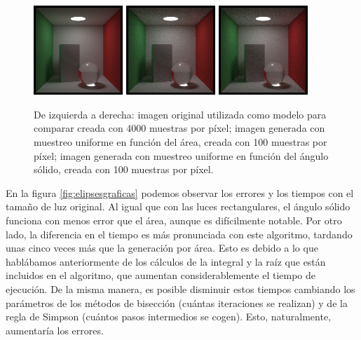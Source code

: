 \documentclass{scrbook}
\begin{document}
\begin{figure}[ht]
	\centering
	\includegraphics[width=0.3\textwidth]{original_ellipse}
	\includegraphics[width=0.3\textwidth]{ellipse_20}
	\includegraphics[width=0.3\textwidth]{ellipse_sa_20}
	
	\caption{De izquierda a derecha: imagen original utilizada como modelo para comparar creada con 4000 muestras por píxel; imagen generada con muestreo uniforme en función del área, creada con 100 muestras por píxel; imagen generada con muestreo uniforme en función del ángulo sólido,  creada con 100 muestras por píxel.}
	\label{fig:cornell_ellipse}
\end{figure}

En la figura \ref{fig:elipsesgraficas} podemos observar los errores y los tiempos con el tamaño de luz original. Al igual que con las luces rectangulares, el ángulo sólido funciona con menos error que el área, aunque es difícilmente notable. Por otro lado, la diferencia en el tiempo es más pronunciada con este algoritmo, tardando unas cinco veces más que la generación por área. Esto es debido a lo que hablábamos anteriormente de los cálculos de la integral y la raíz que están incluidos en el algoritmo, que aumentan considerablemente el tiempo de ejecución. De la misma manera, es posible disminuir estos tiempos cambiando los parámetros de los métodos de bisección (cuántas iteraciones se realizan) y de la regla de Simpson (cuántos pasos intermedios se cogen). Esto, naturalmente, aumentaría los errores.
\end{document}
